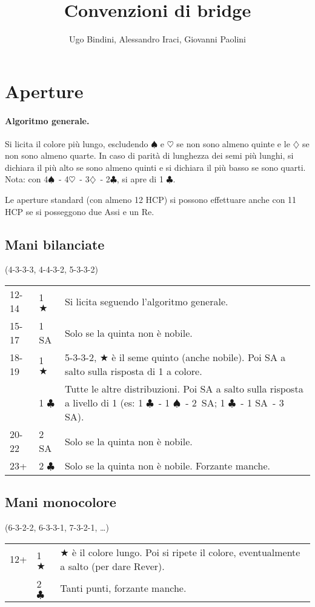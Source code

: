 \documentclass[a4paper,10pt]{article}
\title{Convenzioni di bridge}
\author{Ugo Bindini, Alessandro Iraci, Giovanni Paolini}
\renewcommand{\c}{$\clubsuit$\xspace}
\renewcommand{\d}{$\diamondsuit$\xspace}
\newcommand{\h}{$\heartsuit$\xspace}
\newcommand{\s}{$\spadesuit$\xspace}
\renewcommand{\j}{$\bigstar$\xspace}
\newcommand{\sa}{SA\xspace}
\newcommand{\smallspace}{\vskip0.3cm}
\newenvironment{threecol}
  {\smallspace\noindent\begin{tabular}{l l p{0.78\textwidth}}}
  {\end{tabular}\smallspace}
\begin{document}
\maketitle

\tableofcontents

\pagebreak
\section{Aperture}

\paragraph{Algoritmo generale.}
Si licita il colore più lungo, escludendo \s e \h se non sono almeno quinte e le \d se non sono almeno quarte.
In caso di parità di lunghezza dei semi più lunghi, si dichiara il più alto se sono almeno quinti e si dichiara il più basso se sono quarti.
Nota: con 4\s\ - 4\h\ - 3\d\ - 2\c, si apre di 1 \c.

\noindent Le aperture standard (con almeno 12 HCP) si possono effettuare anche con 11 HCP se si posseggono due Assi e un Re.

\subsection{Mani bilanciate}
(4-3-3-3, 4-4-3-2, 5-3-3-2)
\smallspace

\begin{threecol}
 12-14 & 1 \j & Si licita seguendo l'algoritmo generale.\\
 15-17 & 1 \sa & Solo se la quinta non è nobile.\\
 18-19 & 1 \j & 5-3-3-2, \j è il seme quinto (anche nobile). Poi \sa a salto sulla risposta di 1 a colore.\\
       & 1 \c & Tutte le altre distribuzioni. Poi \sa a salto sulla risposta a livello di 1 (es: 1 \c\ - 1 \s\ - \mbox{2 \sa}; 1 \c\ - 1 \sa\ - 3 \sa).\\
 20-22 & 2 \sa & Solo se la quinta non è nobile.\\
 23+ & 2 \c & Solo se la quinta non è nobile. Forzante manche.
\end{threecol}


\subsection{Mani monocolore}
(6-3-2-2, 6-3-3-1, 7-3-2-1, \dots)

\begin{threecol}
 12+ & 1 \j & \j è il colore lungo. Poi si ripete il colore, eventualmente a salto (per dare Rever).\\
 & 2 \c & Tanti punti, forzante manche.
\end{threecol}
\end{document}

